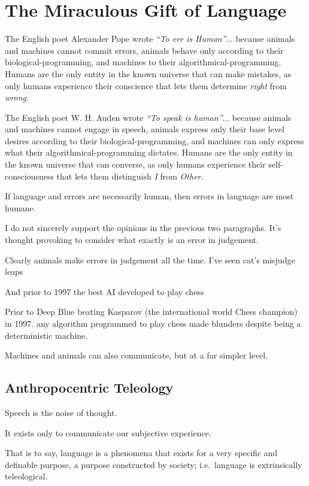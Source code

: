 \chapter{The Miraculous Gift of Language}

The English poet Alexander Pope wrote \textit{``To err is Human''}... because animals and machines cannot commit errors, animals behave only according to their biological-programming, and machines to their algorithmical-programming. Humans are the only entity in the known universe that can make mistakes, as only humans experience their conscience that lets them determine \textit{right} from \textit{wrong}.

The English poet W. H. Auden wrote \textit{``To speak is human''}... because animals and machines cannot engage in speech, animals express only their base level desires according to their biological-programming, and machines can only express what their algorithmical-programming dictates. Humans are the only entity in the known universe that can converse, as only humans experience their self-consciousness that lets them distinguish \textit{I} from \textit{Other}. 

If language and errors are necessarily human, then errors in language are most humane.

I do not sincerely support the opinions in the previous two paragraphs. It's thought provoking to consider what exactly is an error in judgement. 

Clearly animals make errors in judgement all the time. I've seen cat's misjudge leaps

And prior to 1997 the best AI developed to play chess

Prior to Deep Blue beating Kasparov (the international world Chess champion) in 1997. any algorithm programmed to play chess made blunders despite being a deterministic machine.

Machines and animals can also communicate, but at a far simpler level. 

\section{Anthropocentric Teleology}
Speech is the noise of thought.

It exists only to communicate our subjective experience.

That is to say, language is a phenomena that exists for a very specific and definable purpose, a purpose constructed by society; i.e.\ language is extrinsically teleological. 

